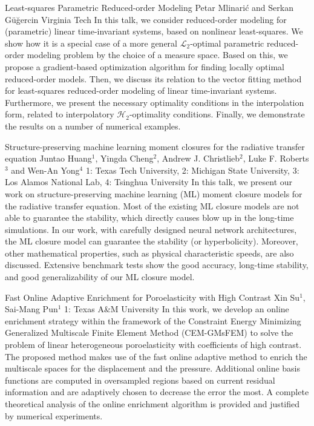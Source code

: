 \vspace{1.5ex}
\abs
{Least-squares Parametric Reduced-order Modeling}
{Petar Mlinari\'{c} and Serkan G\"{u}\u{g}ercin}
{Virginia Tech}
{In this talk, we consider reduced-order modeling for (parametric) linear time-invariant systems, based on nonlinear least-squares. We show how it is a special case of a more general $\mathcal{L}_2$-optimal parametric reduced-order modeling problem by the choice of a measure space. Based on this, we propose a gradient-based optimization algorithm for finding locally optimal reduced-order models. Then, we discuss its relation to the vector fitting method for least-squares reduced-order modeling of linear time-invariant systems. Furthermore, we present the necessary optimality conditions in the interpolation form, related to interpolatory $\mathcal{H}_2$-optimality conditions. Finally, we demonstrate the results on a number of numerical examples.}


\vspace{1.5ex}
\abs
{Structure-preserving machine learning moment closures for the radiative transfer equation}
{Juntao Huang$^{1}$, Yingda Cheng$^{2}$, Andrew J. Christlieb$^{2}$, Luke F. Roberts$^{3}$ and Wen-An Yong$^{4}$}
{1: Texas Tech University, 2: Michigan State University, 3: Los Alamos National Lab, 4: Tsinghua University}
{In this talk, we present our work on structure-preserving machine learning (ML) moment closure models for the radiative transfer equation. Most of the existing ML closure models are not able to guarantee the stability, which directly causes blow up in the long-time simulations. In our work, with carefully designed neural network architectures, the ML closure model can guarantee the stability (or hyperbolicity). Moreover, other mathematical properties, such as physical characteristic speeds, are also discussed. Extensive benchmark tests show the good accuracy, long-time stability, and good generalizability of our ML closure model.}


\vspace{1.5ex}
\abs
{Fast Online Adaptive Enrichment for Poroelasticity with High Contrast}
{Xin Su$^{1}$, Sai-Mang Pun$^{1}$}
{1: Texas A\&M University}
{In this work, we develop an online enrichment strategy within the framework of the Constraint Energy Minimizing Generalized Multiscale Finite Element Method (CEM-GMsFEM) to solve the problem of linear heterogeneous poroelasticity with coefficients of high contrast. The proposed method makes use of the fast online adaptive method to enrich the multiscale spaces for the displacement and the pressure. Additional online basis functions are computed in oversampled regions based on current residual information and are adaptively chosen to decrease the error the most. A complete theoretical analysis of the online enrichment algorithm is provided and justified by numerical experiments.
}



